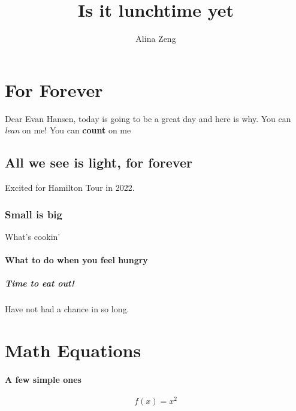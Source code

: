 \documentclass[a4paper, 12pt]{article}
\author{Alina Zeng}
\title{\textbf{Is it lunchtime yet}}
\begin{document}
\maketitle
\newpage
{}   %


\tableofcontents
\newpage  %

\section{For Forever}
Dear Evan Hansen, today is going to be a great day and here is why. \newline
You can \textsl{lean} on me!
You can \textbf{count} on me~ \newline


\subsection{All we see is light, for forever}
Excited for Hamilton Tour in 2022. \newline

\subsubsection {{\small Small} is {\Large big}}
What's cookin'

\paragraph {What to do when you feel hungry}

\subparagraph {Time to eat out!} Have not had a chance in so long.

\section{Math Equations}
\paragraph {A few simple ones}
\begin{equation*}
  f(x) = x^2
\end{equation*}
\end{document}
